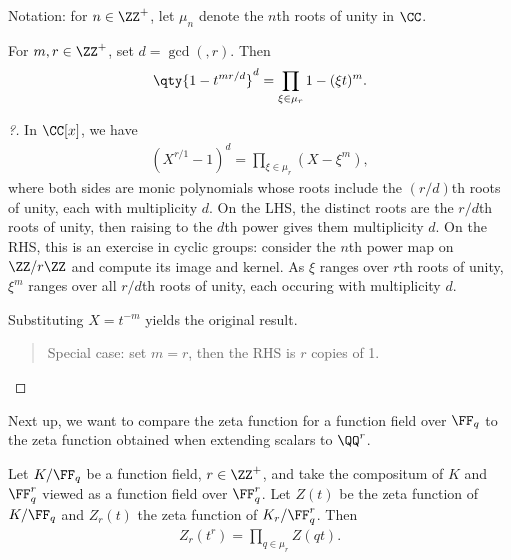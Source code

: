 Notation: for \(n\in\ZZ^+\), let \(\mu_n\) denote the \(n\)th roots of
unity in \(\CC\).

\begin{lemma}[?]

For \(m, r\in \ZZ^+\), set \(d = \gcd(, r)\). Then
\begin{align*}  
\qty{1-t^{mr/d}}^d = \prod_{\xi\in \mu_r}  1 - (\xi t)^m
.\end{align*}

\end{lemma}

\begin{proof}[?]

In \(\CC[x]\), we have
\begin{align*}  
(X^{r/1} - 1)^d = \prod_{\xi\in \mu_r}(X - \xi^m)
,\end{align*} where both sides are monic polynomials whose roots include
the \((r/d)\)th roots of unity, each with multiplicity \(d\). On the
LHS, the distinct roots are the \(r/d\)th roots of unity, then raising
to the \(d\)th power gives them multiplicity \(d\). On the RHS, this is
an exercise in cyclic groups: consider the \(n\)th power map on
\(\ZZ/r\ZZ\) and compute its image and kernel. As \(\xi\) ranges over
\(r\)th roots of unity, \(\xi^m\) ranges over all \(r/d\)th roots of
unity, each occuring with multiplicity \(d\).

Substituting \(X= t^{-m}\) yields the original result.

\begin{quote}
Special case: set \(m=r\), then the RHS is \(r\) copies of 1.
\end{quote}

\end{proof}

Next up, we want to compare the zeta function for a function field over
\(\FF_q\) to the zeta function obtained when extending scalars to
\(\QQ^r\).

\begin{proposition}[?]

Let \(K/\FF_q\) be a function field, \(r\in \ZZ^+\), and take the
compositum of \(K\) and \(\FF_q^r\) viewed as a function field over
\(\FF_q^r\). Let \(Z(t)\) be the zeta function of \(K/\FF_q\) and
\(Z_r(t)\) the zeta function of \(K_r/\FF_q^r\). Then
\begin{align*}  
Z_r(t^r) = \prod_{q\in \mu_r} Z(qt)
.\end{align*}

\end{proposition}

